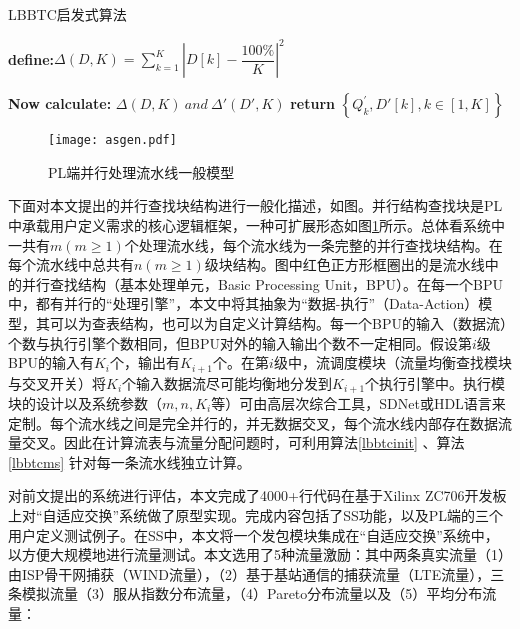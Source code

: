 \begin{algorithm}[!h]
	\caption{LBBTC启发式算法  \label{lbbtcms}}
	\IncMargin{2em}
	\DontPrintSemicolon
	
\textbf{define:}$\Delta(D,K) =\sum ^{K}_{k=1}\left| D\left[ k\right] -\dfrac {100\% }{K}\right| ^{2}$\;


\textbf{Now calculate:} $\Delta(D,K)\  and\  \Delta'(D',K) $\;
{
	\textbf{return} $\left\{ Q^{'}_{k},D'\left[ k\right] ,k\in \left[ 1,K\right] \right\} $\;
}
\end{algorithm}

\begin{figure}[!ht]
	\centering 
	\texttt{[image: asgen.pdf]}
	\caption{PL端并行处理流水线一般模型} \label{fig:asgen}
\end{figure}

下面对本文提出的并行查找块结构进行一般化描述，如图。并行结构查找块是PL中承载用户定义需求的核心逻辑框架，一种可扩展形态如图\ref{fig:asgen}所示。总体看系统中一共有$m(m\geq 1)$个处理流水线，每个流水线为一条完整的并行查找块结构。在每个流水线中总共有$ n(m \geq 1) $级块结构。图中红色正方形框圈出的是流水线中的并行查找结构（基本处理单元，Basic Processing Unit，BPU）。在每一个BPU中，都有并行的“处理引擎”，本文中将其抽象为“数据-执行”（Data-Action）模型，其可以为查表结构，也可以为自定义计算结构。每一个BPU的输入（数据流）个数与执行引擎个数相同，但BPU对外的输入输出个数不一定相同。假设第$i$级BPU的输入有$K_i$个，输出有$K_{i+1}$个。在第$i$级中，流调度模块（流量均衡查找模块与交叉开关）将$K_i$个输入数据流尽可能均衡地分发到$K_{i+1}$个执行引擎中。执行模块的设计以及系统参数（$m,n,K_i$等）可由高层次综合工具，SDNet或HDL语言来定制。每个流水线之间是完全并行的，并无数据交叉，每个流水线内部存在数据流量交叉。因此在计算流表与流量分配问题时，可利用算法\ref{lbbtcinit} 、算法\ref{lbbtcms} 针对每一条流水线独立计算。




\label{spe4}

对前文提出的系统进行评估，本文完成了4000+行代码在基于Xilinx ZC706开发板上对“自适应交换”系统做了原型实现。完成内容包括了SS功能，以及PL端的三个用户定义测试例子。在SS中，本文将一个发包模块集成在“自适应交换”系统中，以方便大规模地进行流量测试。本文选用了5种流量激励：其中两条真实流量（1）由ISP骨干网捕获（WIND流量），（2）基于基站通信的捕获流量（LTE流量），三条模拟流量（3）服从指数分布流量，（4）Pareto分布流量以及（5）平均分布流量：

